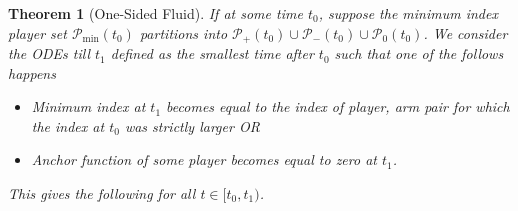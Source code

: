 \documentclass{article}
\newtheorem{theorem}{Theorem}
\begin{document}
\begin{theorem}[One-Sided Fluid]
\label{thm:onesidedgeneral}
    If at some time $t_0$, suppose the minimum index player set $\mathcal{P}_{\min}(t_0)$ partitions into $\mathcal{P}_{+}(t_0)\cup\mathcal{P}_{-}(t_0)\cup \mathcal{P}_{0}(t_0)$. We consider the ODEs till $t_1$ defined as the smallest time after $t_0$ such that  one of the follows happens
    \begin{itemize}
    \item Minimum index at $t_1$ becomes equal to the index of player, arm pair for which the index at $t_0$ was strictly larger OR
    \item Anchor function of some player becomes equal to zero at $t_1$.
 \end{itemize}

        This gives  the following for all $t\in [t_0,t_1)$.


\end{theorem}
\end{document}
